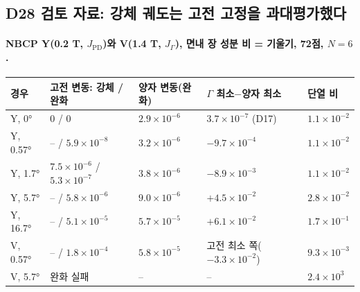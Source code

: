\subsection{D28 검토 자료: 강체 궤도는 고전 고정을 과대평가했다}\label{d28-results}
\begingroup%
  \framesubtitle{NBCP Y(0.2 T, $J_{\mathrm{PD}}$)와 V(1.4 T, $J_\Gamma$), 면내 장 성분 비 = 기울기, 72점, $N=6$.}
  \footnotesize\renewcommand{\arraystretch}{1.08}
  \begin{tabularx}{\textwidth}{@{}P{1.9cm}P{2.3cm}P{2.3cm}P{2.1cm}Y@{}}
    \toprule
    경우 & 고전 변동: 강체 / 완화 & 양자 변동(완화) & $\Gamma$ 최소$-$양자 최소 & 단열 비 \\
    \midrule
    Y, 0° & 0 / 0 & $2.9\times10^{-6}$ & $3.7\times10^{-7}$ (D17) & $1.1\times10^{-2}$ \\
    Y, 0.57° & -- / $5.9\times10^{-8}$ & $3.2\times10^{-6}$ & $-9.7\times10^{-4}$ & $1.1\times10^{-2}$ \\
    Y, 1.7° & $7.5\times10^{-6}$ / $5.3\times10^{-7}$ & $3.8\times10^{-6}$ & $-8.9\times10^{-3}$ & $1.1\times10^{-2}$ \\
    Y, 5.7° & -- / $5.8\times10^{-6}$ & $9.0\times10^{-6}$ & $+4.5\times10^{-2}$ & $2.8\times10^{-2}$ \\
    Y, 16.7° & -- / $5.1\times10^{-5}$ & $5.7\times10^{-5}$ & $+6.1\times10^{-2}$ & $1.7\times10^{-1}$ \\
    V, 0.57° & -- / $1.8\times10^{-4}$ & $5.8\times10^{-5}$ & 고전 최소 쪽($-3.3\times10^{-2}$) & $9.3\times10^{-3}$ \\
    V, 5.7° & 완화 실패 & -- & -- & $2.4\times10^{3}$ \\
    \bottomrule
  \end{tabularx}
  \par\smallskip
\endgroup


